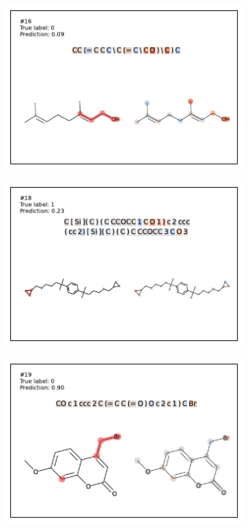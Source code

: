 \begin{figure}
\begin{subfigure}[b]{0.33\textwidth}
\end{subfigure} 
\begin{subfigure}[b]{0.33\textwidth} 
  \centering 
  \includegraphics[width=\textwidth]{figures/ames/ames16.pdf} 
\end{subfigure}\begin{subfigure}[b]{0.33\textwidth} 
  \centering 
  \includegraphics[width=\textwidth]{figures/ames/ames18.pdf} 
\end{subfigure}\begin{subfigure}[b]{0.33\textwidth} 
  \centering 
  \includegraphics[width=\textwidth]{figures/ames/ames19.pdf} 

\end{subfigure}
\end{figure}
